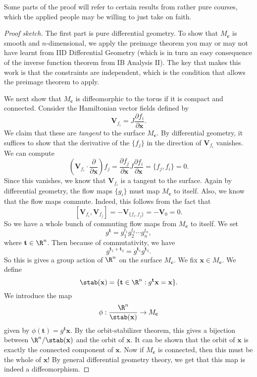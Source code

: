\documentclass[a4paper]{article}
\begin{document}
Some parts of the proof will refer to certain results from rather pure courses, which the applied people may be willing to just take on faith.
\begin{proof}[Proof sketch]
  The first part is pure differential geometry. To show that $M_\mathbf{c}$ is smooth and $n$-dimensional, we apply the preimage theorem you may or may not have learnt from IID Differential Geometry (which is in turn an easy consequence of the inverse function theorem from IB Analysis II). The key that makes this work is that the constraints are independent, which is the condition that allows the preimage theorem to apply.

  We next show that $M_\mathbf{c}$ is diffeomorphic to the torus if it is compact and connected. Consider the Hamiltonian vector fields defined by
  \[
    \mathbf{V}_{f_i} = J \frac{\partial f_i}{\partial \mathbf{x}}.
  \]
  We claim that these are \emph{tangent} to the surface $M_\mathbf{c}$. By differential geometry, it suffices to show that the derivative of the $\{f_j\}$ in the direction of $\mathbf{V}_{f_i}$ vanishes. We can compute
  \[
    \left(\mathbf{V}_{f_i} \cdot \frac{\partial}{\partial \mathbf{x}}\right)f_j = \frac{\partial f_j}{\partial \mathbf{x}} J \frac{\partial f_i}{\partial \mathbf{x}} = \{f_j, f_i\} = 0.
  \]
  Since this vanishes, we know that $\mathbf{V}_{f_i}$ is a tangent to the surface. Again by differential geometry, the flow maps $\{g_i\}$ must map $M_\mathbf{c}$ to itself. Also, we know that the flow maps commute. Indeed, this follows from the fact that
  \[
    [\mathbf{V}_{f_i}, \mathbf{V}_{f_j}] = -\mathbf{V}_{\{f_i, f_j\}} = -\mathbf{V}_{0} = 0.
  \]
  So we have a whole bunch of commuting flow maps from $M_\mathbf{c}$ to itself. We set
  \[
    g^\mathbf{t} = g_1^{t_1} g_2^{t_2} \cdots g_n^{t_n},
  \]
  where $\mathbf{t} \in \R^n$. Then because of commutativity, we have
  \[
    g^{\mathbf{t}_1 + \mathbf{t}_2} = g^{\mathbf{t}_1}g^{\mathbf{t}_2}.
  \]
  So this is gives a group action of $\R^n$ on the surface $M_\mathbf{c}$. We fix $\mathbf{x} \in M_\mathbf{c}$. We define
  \[
    \stab(\mathbf{x}) = \{\mathbf{t} \in \R^n: g^\mathbf{t}\mathbf{x} = \mathbf{x}\}.
  \]
  We introduce the map
  \[
    \phi: \frac{\R^n}{\stab(\mathbf{x})} \to M_\mathbf{c}
  \]
  given by $\phi(\mathbf{t}) = g^{\mathbf{t}}\mathbf{x}$. By the orbit-stabilizer theorem, this gives a bijection between $\R^n/\stab(\mathbf{x})$ and the orbit of $\mathbf{x}$. It can be shown that the orbit of $\mathbf{x}$ is exactly the connected component of $\mathbf{x}$. Now if $M_\mathbf{c}$ is connected, then this must be the whole of $\mathbf{x}$! By general differential geometry theory, we get that this map is indeed a diffeomorphism.


\end{proof}
\end{document}
